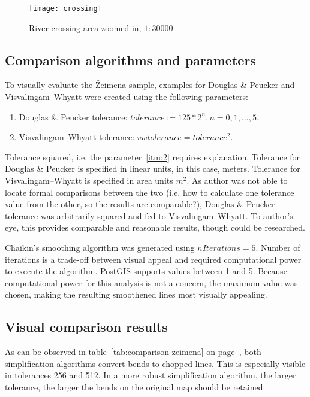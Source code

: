 \documentclass[a4paper]{article}
\newcommand{\DP}{Douglas \& Peucker}
\newcommand{\VW}{Visvalingam--Whyatt}
\begin{document}
\begin{figure}[h]
    \centering
    \texttt{[image: crossing]}
    \caption{River crossing area zoomed in, $1:30 000$}
    \label{fig:crossing}
\end{figure}

\subsection{Comparison algorithms and parameters}
\label{sec:algs-and-params}

To visually evaluate the Žeimena sample, examples for {\DP} and {\VW}
were created using the following parameters:

\begin{enumerate}[label=(\Roman*)]
    \item {\DP} tolerance: $tolerance := 125 * 2^n, n = 0,1,...,5$.
    \item {\VW} tolerance: $vwtolerance = tolerance ^ 2$\label{itm:2}.
\end{enumerate}

Tolerance squared, i.e. the parameter~\ref{itm:2} requires explanation.
Tolerance for {\DP} is specified in linear units, in this case, meters.
Tolerance for {\VW} is specified in area units $m^2$. As author was not able to
locate formal comparisons between the two (i.e. how to calculate one tolerance
value from the other, so the results are comparable?), {\DP} tolerance was
arbitrarily squared and fed to {\VW}. To author's eye, this provides comparable
and reasonable results, though could be researched.

Chaikin's smoothing algorithm was generated using $nIterations = 5$. Number of
iterations is a trade-off between visual appeal and required computational
power to execute the algorithm. PostGIS supports values between 1 and 5. Because
computational power for this analysis is not a concern, the maximum value was chosen,
making the resulting smoothened lines most visually appealing.

\subsection{Visual comparison results}

As can be observed in table~\ref{tab:comparison-zeimena} on
page~\pageref{tab:comparison-zeimena}, both simplification algorithms convert
bends to chopped lines. This is especially visible in tolerances 256 and 512.
In a more robust simplification algorithm, the larger tolerance, the larger the
bends on the original map should be retained.
\end{document}
